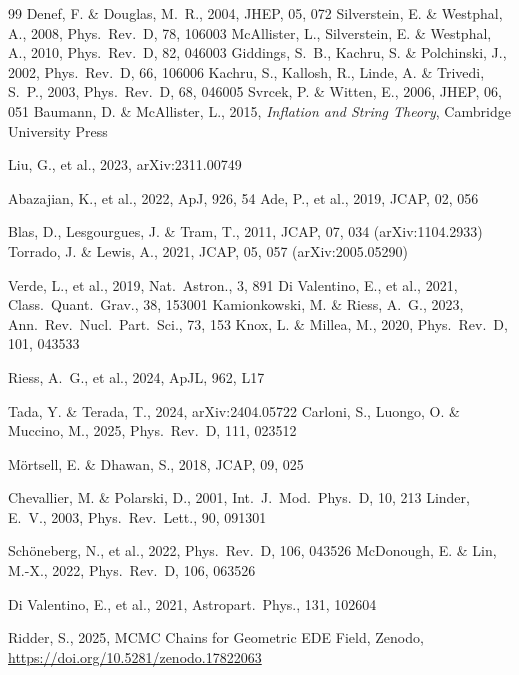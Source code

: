\documentclass[a4paper,11pt]{article}
\begin{document}
\begin{thebibliography}{99}
 Denef, F. \& Douglas, M.~R., 2004, JHEP, 05, 072
 Silverstein, E. \& Westphal, A., 2008, Phys.\ Rev.\ D, 78, 106003
 McAllister, L., Silverstein, E. \& Westphal, A., 2010, Phys.\ Rev.\ D, 82, 046003
 Giddings, S.~B., Kachru, S. \& Polchinski, J., 2002, Phys.\ Rev.\ D, 66, 106006
 Kachru, S., Kallosh, R., Linde, A. \& Trivedi, S.~P., 2003, Phys.\ Rev.\ D, 68, 046005
 Svrcek, P. \& Witten, E., 2006, JHEP, 06, 051
 Baumann, D. \& McAllister, L., 2015, \textit{Inflation and String Theory}, Cambridge University Press

 Liu, G., et al., 2023, arXiv:2311.00749

 Abazajian, K., et al., 2022, ApJ, 926, 54
 Ade, P., et al., 2019, JCAP, 02, 056

 Blas, D., Lesgourgues, J. \& Tram, T., 2011, JCAP, 07, 034 (arXiv:1104.2933)
 Torrado, J. \& Lewis, A., 2021, JCAP, 05, 057 (arXiv:2005.05290)

 Verde, L., et al., 2019, Nat.\ Astron., 3, 891
 Di Valentino, E., et al., 2021, Class.\ Quant.\ Grav., 38, 153001
 Kamionkowski, M. \& Riess, A.~G., 2023, Ann.\ Rev.\ Nucl.\ Part.\ Sci., 73, 153
 Knox, L. \& Millea, M., 2020, Phys.\ Rev.\ D, 101, 043533

 Riess, A.~G., et al., 2024, ApJL, 962, L17

 Tada, Y. \& Terada, T., 2024, arXiv:2404.05722
 Carloni, S., Luongo, O. \& Muccino, M., 2025, Phys.\ Rev.\ D, 111, 023512

 M\"{o}rtsell, E. \& Dhawan, S., 2018, JCAP, 09, 025

 Chevallier, M. \& Polarski, D., 2001, Int.\ J.\ Mod.\ Phys.\ D, 10, 213
 Linder, E.~V., 2003, Phys.\ Rev.\ Lett., 90, 091301

 Sch\"{o}neberg, N., et al., 2022, Phys.\ Rev.\ D, 106, 043526
 McDonough, E. \& Lin, M.-X., 2022, Phys.\ Rev.\ D, 106, 063526

 Di Valentino, E., et al., 2021, Astropart.\ Phys., 131, 102604

 Ridder, S., 2025, MCMC Chains for Geometric EDE Field, Zenodo, \url{https://doi.org/10.5281/zenodo.17822063}

\end{thebibliography}
\end{document}
